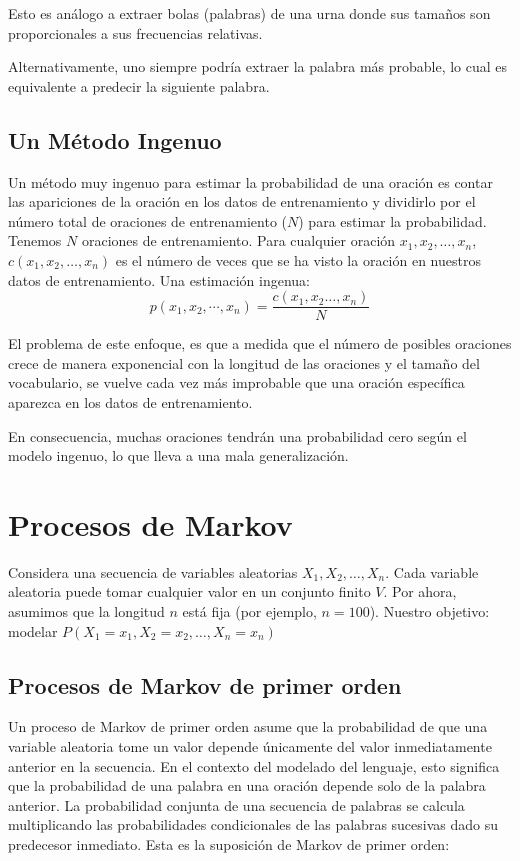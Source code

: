 Esto es análogo a extraer bolas (palabras) de una urna donde sus tamaños son proporcionales a sus frecuencias relativas.

Alternativamente, uno siempre podría extraer la palabra más probable, lo cual es equivalente a predecir la siguiente palabra.


\subsection{Un Método Ingenuo}
Un método muy ingenuo para estimar la probabilidad de una oración es contar las apariciones de la oración en los datos de entrenamiento y dividirlo por el número total de oraciones de entrenamiento ($N$) para estimar la probabilidad. Tenemos $N$ oraciones de entrenamiento.
Para cualquier oración $x_1, x_2, \ldots, x_n$, $c(x_1, x_2, \ldots, x_n)$ es el número de veces que se ha visto la oración en nuestros datos de entrenamiento. Una estimación ingenua: \begin{displaymath}
p(x_1,x_2,\cdots,x_n)=\frac{c(x_1,x_2 \dots,x_n)}{N}
\end{displaymath}

El problema de este enfoque, es que a medida que el número de posibles oraciones crece de manera exponencial con la longitud de las oraciones y el tamaño del vocabulario, se vuelve cada vez más improbable que una oración específica aparezca en los datos de entrenamiento.

En consecuencia, muchas oraciones tendrán una probabilidad cero según el modelo ingenuo, lo que lleva a una mala generalización.

\section{Procesos de Markov}
Considera una secuencia de variables aleatorias $X_1, X_2, \ldots, X_n$. Cada variable aleatoria puede tomar cualquier valor en un conjunto finito $V$. Por ahora, asumimos que la longitud $n$ está fija (por ejemplo, $n = 100$). Nuestro objetivo: modelar $P(X_1 = x_1, X_2 = x_2, \ldots, X_n = x_n)$

\subsection{Procesos de Markov de primer orden}

Un proceso de Markov de primer orden asume que la probabilidad de que una variable aleatoria tome un valor depende únicamente del valor inmediatamente anterior en la secuencia. En el contexto del modelado del lenguaje, esto significa que la probabilidad de una palabra en una oración depende solo de la palabra anterior. La probabilidad conjunta de una secuencia de palabras se calcula multiplicando las probabilidades condicionales de las palabras sucesivas dado su predecesor inmediato. Esta es la suposición de Markov de primer orden:

